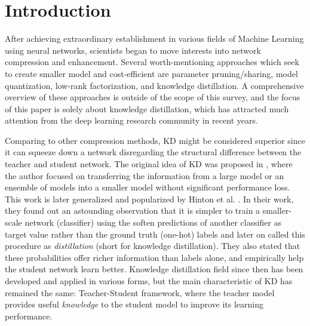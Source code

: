 \section{Introduction}

After achieving extraordinary establishment in various fields of Machine Learning using neural networks, scientists began to move interests into network compression and enhancement. Several worth-mentioning approaches which seek to create smaller model and cost-efficient are parameter pruning/sharing, model quantization, low-rank factorization, and knowledge distillation. A comprehensive overview of these approaches is outside of the scope of this survey, and the focus of this paper is solely about knowledge distillation, which has attracted much attention from the deep learning research community in recent years. 

Comparing to other compression methods, KD might be considered superior since it can squeeze down a network disregarding the structural difference between the teacher and student network. The original idea of KD was proposed in \cite{firstkdpaper}, where the author focused on transferring the information from a large model or an ensemble of models into a smaller model without significant performance loss. This work is later generalized and popularized by Hinton et al. \cite{hintonfirstkd}. In their work, they found out an astounding observation that it is simpler to train a smaller-scale network (classifier) using the soften predictions of another classifier as target value rather than the ground truth (one-hot) labels and later on called this procedure as \textit{distillation} (short for knowledge distillation). They also stated that these probabilities offer richer information than labels alone, and empirically help the student network learn better. Knowledge distillation field since then has been developed and applied in various forms, but the main characteristic of KD has remained the same: Teacher-Student framework, where the teacher model provides useful \textit{knowledge} to the student model to improve its learning performance.

